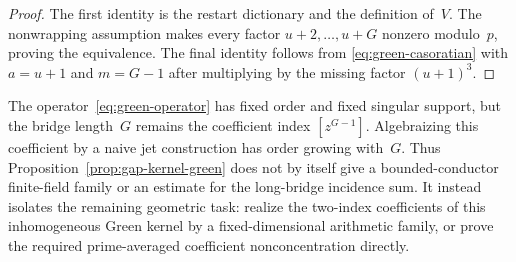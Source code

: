 \begin{proof}
The first identity is the restart dictionary and the definition of~$V$.
The nonwrapping assumption makes every factor $u+2,\ldots,u+G$ nonzero
modulo~$p$, proving the equivalence.  The final identity follows from
\eqref{eq:green-casoratian} with $a=u+1$ and $m=G-1$ after multiplying by
the missing factor $(u+1)^3$.
\end{proof}

\begin{remark}
\label{rem:green-jet-barrier}
The operator~\eqref{eq:green-operator} has fixed order and fixed singular
support, but the bridge length~$G$ remains the coefficient index
$[z^{G-1}]$.  Algebraizing this coefficient by a naive jet construction
has order growing with~$G$.  Thus Proposition~\ref{prop:gap-kernel-green}
does not by itself give a bounded-conductor finite-field family or an
estimate for the long-bridge incidence sum.  It instead isolates the
remaining geometric task: realize the two-index coefficients of this
inhomogeneous Green kernel by a fixed-dimensional arithmetic family, or
prove the required prime-averaged coefficient nonconcentration directly.
\end{remark}

